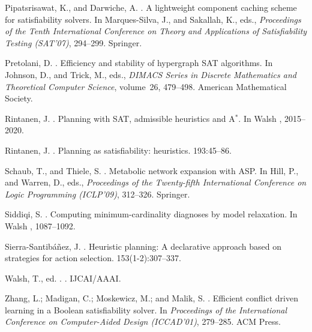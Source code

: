 \documentclass[letterpaper]{article}
\begin{document}
\begin{thebibliography}{}
Pipatsrisawat, K., and Darwiche, A.
.
\newblock A lightweight component caching scheme for satisfiability solvers.
\newblock In Marques-Silva, J., and Sakallah, K., eds., {\em Proceedings of the
  Tenth International Conference on Theory and Applications of Satisfiability
  Testing (SAT'07)},
  294--299.
\newblock Springer.

Pretolani, D.
.
\newblock Efficiency and stability of hypergraph {SAT} algorithms.
\newblock In Johnson, D., and Trick, M., eds., {\em DIMACS Series in Discrete
  Mathematics and Theoretical Computer Science}, volume~26,  479--498.
\newblock American Mathematical Society.

Rintanen, J.
.
\newblock Planning with {SAT}, admissible heuristics and {A}$^*$.
\newblock In Walsh ,  2015--2020.

Rintanen, J.
.
\newblock Planning as satisfiability: heuristics.
 193:45--86.

Schaub, T., and Thiele, S.
.
\newblock Metabolic network expansion with {ASP}.
\newblock In Hill, P., and Warren, D., eds., {\em Proceedings of the
  Twenty-fifth International Conference on Logic Programming (ICLP'09)},  312--326.
\newblock Springer.

Siddiqi, S.
.
\newblock Computing minimum-cardinality diagnoses by model relaxation.
\newblock In Walsh ,  1087--1092.

Sierra-Santib{\'a}{\~n}ez, J.
.
\newblock Heuristic planning: A declarative approach based on strategies for
  action selection.
 153(1-2):307--337.

Walsh, T., ed.
.
. IJCAI/AAAI.

Zhang, L.; Madigan, C.; Moskewicz, M.; and Malik, S.
.
\newblock Efficient conflict driven learning in a {B}oolean satisfiability
  solver.
\newblock In {\em Proceedings of the International Conference on Computer-Aided
  Design (ICCAD'01)},  279--285.
\newblock ACM Press.

\end{thebibliography}

\end{document}
